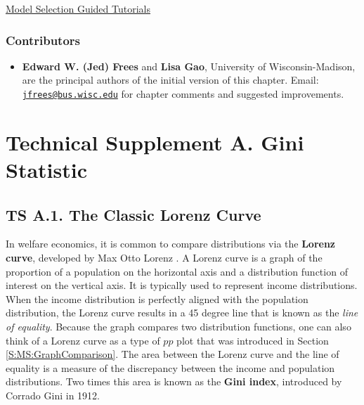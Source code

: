 \documentclass[]{book}
\providecommand{\tightlist}{%
  \setlength{\itemsep}{0pt}\setlength{\parskip}{0pt}}
\theoremstyle{definition}
\theoremstyle{definition}
\theoremstyle{definition}
\theoremstyle{remark}
\begin{document}
\href{http://www.ssc.wisc.edu/~jfrees/loss-data-analytics/loss-data-analytics-model-selection/}{Model
Selection Guided Tutorials}

\subsubsection*{Contributors}\label{contributors-3}

\begin{itemize}
\tightlist
\item
  \textbf{Edward W. (Jed) Frees} and \textbf{Lisa Gao}, University of
  Wisconsin-Madison, are the principal authors of the initial version of
  this chapter. Email:
  \href{mailto:jfrees@bus.wisc.edu}{\nolinkurl{jfrees@bus.wisc.edu}} for
  chapter comments and suggested improvements.
\end{itemize}

\section*{Technical Supplement A. Gini
Statistic}\label{technical-supplement-a.-gini-statistic}

\subsection*{TS A.1. The Classic Lorenz
Curve}\label{ts-a.1.-the-classic-lorenz-curve}

In welfare economics, it is common to compare distributions via the
\textbf{Lorenz curve}, developed by Max Otto Lorenz
\citep{lorenz1905methods}. A Lorenz curve is a graph of the proportion
of a population on the horizontal axis and a distribution function of
interest on the vertical axis. It is typically used to represent income
distributions. When the income distribution is perfectly aligned with
the population distribution, the Lorenz curve results in a 45 degree
line that is known as the \emph{line of equality}. Because the graph
compares two distribution functions, one can also think of a Lorenz
curve as a type of \(pp\) plot that was introduced in Section
\ref{S:MS:GraphComparison}. The area between the Lorenz curve and the
line of equality is a measure of the discrepancy between the income and
population distributions. Two times this area is known as the
\textbf{Gini index}, introduced by Corrado Gini in 1912.
\end{document}
